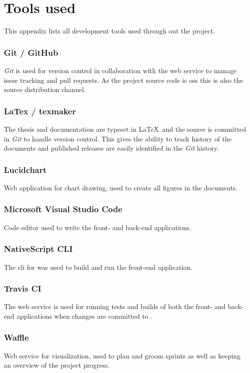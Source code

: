 \chapter{Tools used}
This appendix lists all development tools used through out the project.

\subsection*{Git / GitHub}
\textit{Git} is used for version control in collaboration with the web service  to manage issue tracking and pull requests.
As the project source code is \gls{oss} this is also the source distribution channel.

\subsection*{LaTex / texmaker}
The thesis and documentation are typeset in \LaTeX\ and the source is committed in \textit{Git} to handle version control.
This gives the ability to track history of the documents and published releases are easily identified in the \textit{Git} history.

\subsection*{Lucidchart}
Web application for chart drawing, used to create all figures in the documents.

\subsection*{Microsoft Visual Studio Code}
Code editor used to write the front- and back-end applications.

\subsection*{NativeScript CLI}
The \gls{cli} for  was used to build and run the front-end application.

\subsection*{Travis CI}
The  web service  is used for running tests and builds of both the front- and back-end applications when changes are committed to .

\subsection*{Waffle}
Web service for  visualization, used to plan and groom sprints as well as keeping an overview of the project progress.
